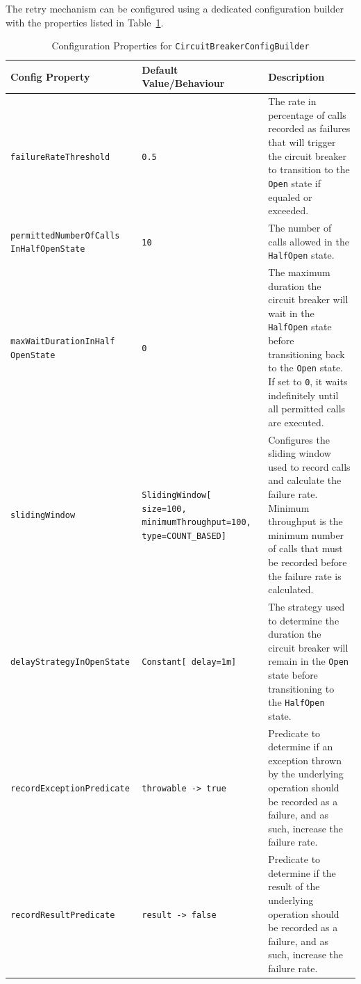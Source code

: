 The retry mechanism can be configured
using a dedicated configuration builder with the properties listed in Table~\ref{tab:cbreaker-config-builder}.

\begin{table}[!htb]
    \centering
    \caption{Configuration Properties for \texttt{CircuitBreakerConfigBuilder}}
    \label{tab:cbreaker-config-builder}
    \vspace{0.3cm}
    \begin{tabular}{|p{5cm}|p{5cm}|p{6cm}|}
        \hline
        \textbf{Config Property}          & \textbf{Default Value/Behaviour} & \textbf{Description}                                                                                                                                        \\ \hline
        \texttt{failureRateThreshold}     & \texttt{0.5}                     & The rate in percentage of calls recorded as failures that will trigger the circuit breaker to transition to the \texttt{Open} state if equaled or exceeded. \\ \hline
        \texttt{permittedNumberOfCalls InHalfOpenState} & \texttt{10} & The number of calls
        allowed in the \texttt{HalfOpen} state. \\ \hline
        \texttt{maxWaitDurationInHalf OpenState} & \texttt{0} & The maximum duration
        the circuit breaker will wait in the \texttt{HalfOpen} state before transitioning back to the \texttt{Open} state.
        If set to \texttt{0}, it waits indefinitely until all permitted calls are executed. \\ \hline
        \texttt{slidingWindow} & \texttt{SlidingWindow[ size=100, minimumThroughput=100, type=COUNT\_BASED]}
        & Configures the sliding window used to record calls and calculate the failure rate.
        Minimum throughput is the minimum number of calls
        that must be recorded before the failure rate is calculated.
        \\ \hline
        \texttt{delayStrategyInOpenState} & \texttt{Constant[ delay=1m]}     & The strategy used to determine the duration the circuit breaker will remain in the \texttt{Open} state before transitioning to the \texttt{HalfOpen} state. \\ \hline
        \texttt{recordExceptionPredicate} & \texttt{throwable ->
            true} & Predicate
        to determine if an exception thrown by the underlying operation should be recorded as a failure, and as such, increase the failure rate. \\ \hline
        \texttt{recordResultPredicate} & \texttt{result ->
            false} & Predicate
        to determine if the result of the underlying operation should be recorded as a failure, and as such, increase the failure rate. \\ \hline
    \end{tabular}
\end{table}

